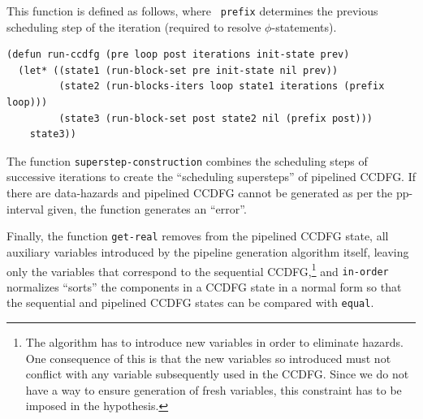   This function is defined as follows, where {\tt
  prefix} determines the previous scheduling step of the
iteration (required to resolve $\phi$-statements).

\begin{verbatim}
(defun run-ccdfg (pre loop post iterations init-state prev)
  (let* ((state1 (run-block-set pre init-state nil prev))
         (state2 (run-blocks-iters loop state1 iterations (prefix loop)))
         (state3 (run-block-set post state2 nil (prefix post)))
    state3))
\end{verbatim}

The
function {\tt superstep-construction} combines the
scheduling steps of successive iterations to create the
``scheduling supersteps'' of pipelined CCDFG.  If there are
data-hazards and pipelined CCDFG cannot be generated as per
the pp-interval given, the function generates an ``error''.



Finally, the function {\tt get-real} removes from the
pipelined CCDFG state, all auxiliary variables introduced by
the pipeline generation algorithm itself, leaving only the
variables that correspond to the sequential
CCDFG,\footnote{The algorithm has to introduce new variables
  in order to eliminate hazards.  One consequence of this is
  that the new variables so introduced must not conflict
  with any variable subsequently used in the CCDFG.  Since
  we do not have a way to ensure generation of fresh
  variables, this constraint has to be imposed in the
  hypothesis.}  and {\tt in-order} normalizes ``sorts'' the
components in a CCDFG state in a normal form so that the
sequential and pipelined CCDFG states can be compared with
{\tt equal}.






